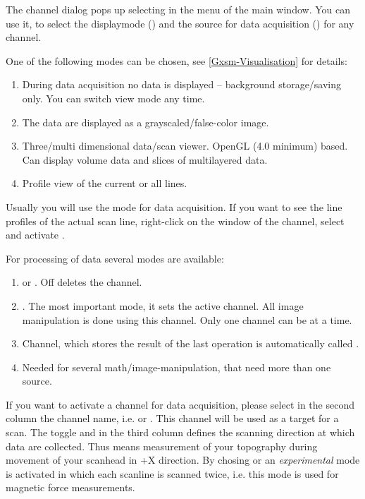 The channel dialog pops up selecting  in the
 menu of the main window.
You can use it, to select the displaymode () and the source for data
acquisition () for any channel.

One of the following modes can be chosen, see \ref{Gxsm-Visualisation} for details:
\begin{enumerate}
\item {} During data acquisition no data is displayed -- background storage/saving only. You can switch view mode any time.
\item {}  The data are displayed as a grayscaled/false-color image.
\item {}  Three/multi dimensional data/scan viewer. OpenGL (4.0 minimum) based. Can display volume data and slices of multilayered data.
\item {}  Profile view of the current or all lines. 
\end{enumerate}
Usually you will use the mode  for data acquisition. If you want to see the line profiles of the actual scan line, right-click on the window of the channel, select  and activate .

For processing of data several modes are available:
\begin{enumerate}
\item {} or . Off deletes the channel.
\item {}. The most important mode, it sets the active channel. All image manipulation is done using this channel. Only one channel can be  at a time.
\item {} Channel, which stores the result of the last operation is automatically called .
\item {} Needed for several math/image-manipulation, that need more than one source.
\end{enumerate}

If you want to activate a channel for data acquisition, please select in the second column the channel name, i.e.  or . This channel will be used as a target for a scan. The toggle \menuentry{$->$} and \menuentry{$<-$} in the third column defines the scanning direction at which data are collected. Thus  means measurement of your topography during movement of your scanhead in +X direction. By chosing  or  an \emph{experimental} mode is activated in which each scanline is scanned twice, i.e. this mode is used for magnetic force measurements.



